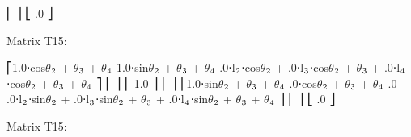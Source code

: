 \documentclass[letterpaper,10pt,english,openany,oneside]{sphinxmanual}
\begin{document}
\begin{sphinxVerbatim}[commandchars=\\\{\}]
⎢                                                                                                                                                   ⎥
⎣                                                                                                           .0                                  ⎦


Matrix T\PYGZus{}1\PYGZus{}5:

⎡1.0⋅cos\(\theta\)\(\sb{\text{2}}\) + \(\theta\)\(\sb{\text{3}}\) + \(\theta\)\(\sb{\text{4}}\)  \PYGZhy{}1.0⋅sin\(\theta\)\(\sb{\text{2}}\) + \(\theta\)\(\sb{\text{3}}\) + \(\theta\)\(\sb{\text{4}}\)       .0⋅l\(\sb{\text{2}}\)⋅cos\(\theta\)\(\sb{\text{2}}\) + .0⋅l\(\sb{\text{3}}\)⋅cos\(\theta\)\(\sb{\text{2}}\) + \(\theta\)\(\sb{\text{3}}\) + .0⋅l\(\sb{\text{4}}\)⋅cos\(\theta\)\(\sb{\text{2}}\) + \(\theta\)\(\sb{\text{3}}\) + \(\theta\)\(\sb{\text{4}}\)    ⎤
⎢                                                                                                                    ⎥
⎢                                             \PYGZhy{}1.0                                                                ⎥
⎢                                                                                                                    ⎥
⎢1.0⋅sin\(\theta\)\(\sb{\text{2}}\) + \(\theta\)\(\sb{\text{3}}\) + \(\theta\)\(\sb{\text{4}}\)  .0⋅cos\(\theta\)\(\sb{\text{2}}\) + \(\theta\)\(\sb{\text{3}}\) + \(\theta\)\(\sb{\text{4}}\)   .0   .0⋅l\(\sb{\text{2}}\)⋅sin\(\theta\)\(\sb{\text{2}}\) + .0⋅l\(\sb{\text{3}}\)⋅sin\(\theta\)\(\sb{\text{2}}\) + \(\theta\)\(\sb{\text{3}}\) + .0⋅l\(\sb{\text{4}}\)⋅sin\(\theta\)\(\sb{\text{2}}\) + \(\theta\)\(\sb{\text{3}}\) + \(\theta\)\(\sb{\text{4}}\)    ⎥
⎢                                                                                                                    ⎥
⎣                                                                                .0                              ⎦


Matrix T\PYGZus{}1\PYGZus{}5:    


\end{sphinxVerbatim}
\end{document}
